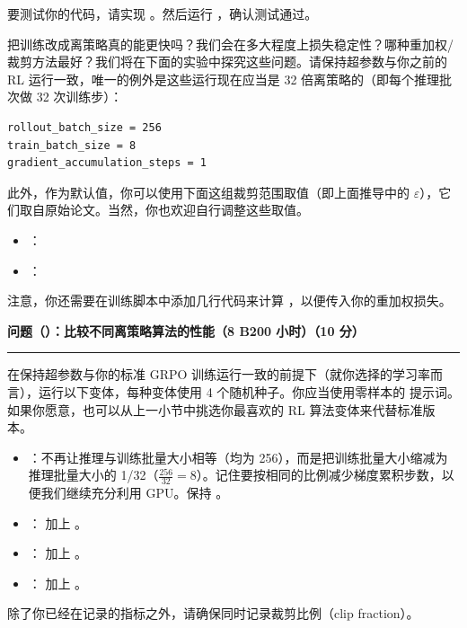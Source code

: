 要测试你的代码，请实现 。然后运行 ，确认测试通过。

把训练改成离策略真的能更快吗？我们会在多大程度上损失稳定性？哪种重加权/裁剪方法最好？我们将在下面的实验中探究这些问题。请保持超参数与你之前的 RL 运行一致，唯一的例外是这些运行现在应当是 32 倍离策略的（即每个推理批次做 32 次训练步）：

\begin{lstlisting}
rollout_batch_size = 256
train_batch_size = 8
gradient_accumulation_steps = 1
\end{lstlisting}

此外，作为默认值，你可以使用下面这组裁剪范围取值（即上面推导中的 $\varepsilon$），它们取自原始论文。当然，你也欢迎自行调整这些取值。
\begin{itemize}
  \item {}：
  \item {}：
\end{itemize}

注意，你还需要在训练脚本中添加几行代码来计算 ，以便传入你的重加权损失。

\medskip
\noindent\textbf{问题（）：比较不同离策略算法的性能（8 B200 小时）（10 分）}
\par\nobreak\smallskip\hrule\nobreak\medskip

在保持超参数与你的标准 GRPO 训练运行一致的前提下（就你选择的学习率而言），运行以下变体，每种变体使用 4 个随机种子。你应当使用零样本的  提示词。如果你愿意，也可以从上一小节中挑选你最喜欢的 RL 算法变体来代替标准版本。
\begin{itemize}
  \item {}：不再让推理与训练批量大小相等（均为 256），而是把训练批量大小缩减为推理批量大小的 1/32（$\frac{256}{32} = 8$）。记住要按相同的比例减少梯度累积步数，以便我们继续充分利用 GPU。保持 。
  \item {}： 加上 。
  \item {}： 加上 。
  \item {}： 加上 。
\end{itemize}
除了你已经在记录的指标之外，请确保同时记录裁剪比例（clip fraction）。

